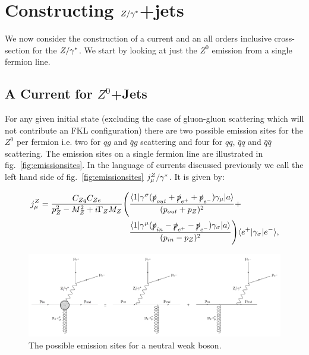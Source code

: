 \section{Constructing $Z/\gamma^*$+jets}
	\label{sec:Zcurrents}

	We now consider the construction of a current and an all orders
	inclusive cross-section for the $Z/\gamma^*$.  We start by looking at just
	the $Z^0$ emission from a single fermion line.

	\subsection{A Current for $Z^0$+Jets}
		\label{sub:zCurrent}

		For any given initial state (excluding the case of gluon-gluon scattering which will
		not contribute an FKL configuration) there are two possible emission sites for the
		$Z^0$ per fermion i.e. two for $qg$ and $\bar qg$ scattering and four for $qq$,
		$\bar qq$ and $\bar q\bar q$ scattering. The emission sites on a single fermion line
		are illustrated in fig.~\eqref{fig:emissionsites}.  In the language of currents discussed
		previously we call the left hand side of fig.~\eqref{fig:emissionsites} $j_\mu^Z/\gamma^*$.
		It is given by:

		\begin{align}
		  \begin{split}
		    j^Z_\mu = \frac{C_{Zq}C_{Ze}}{p_Z^2 - M^2_Z +
		      i\Gamma_ZM_Z}\Bigg(&\frac{\langle 1 | \gamma^{\sigma}(\slashed p_{out} + \slashed
		        p_{e^+} + \slashed p_{e^-})\gamma_{\mu} | a \rangle}{(p_{out} + p_Z)^2} + \\
		    &\frac{\langle 1 | \gamma^{\mu}(\slashed p_{in} - \slashed p_{e^+} - \slashed
		        p_{e^-})\gamma_{\sigma} | a \rangle}{(p_{in} - p_Z)^2}\Bigg)\langle e^+ | \gamma_{\sigma} | e^- \rangle,
		    \label{eqn:Zcurrent}
		  \end{split}
		\end{align}

		\begin{figure}[bt]
			\includegraphics[width=0.98\linewidth]{figures/EmissionSites.pdf}
			\caption{The possible emission sites for a neutral weak boson.}
			\label{fig:emissionsites}
		\end{figure}

